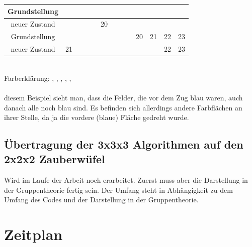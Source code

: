 \documentclass[12pt,a4paper, usenames, dvipsnames]{scrartcl}
\begin{document}
\begin{tabular}{|c|c|c|c|c|c|c|c|c|c|c|c|c|}
\hline
Grundstellung & \color{gray}{0} & \color{gray}{1} & \color{gray}{2} & \color{gray}{3} & \color{red}{4} & \color{red}{5} & \color{ForestGreen}{6} & \color{ForestGreen}{7} & \color{orange}{8} & \color{orange}{9} & \color{blue}{10} & \color{blue}{11} \\
\hline
neuer Zustand & \color{gray}{0} & \color{gray}{1} & \color{red}{4} & \color{red}{12} & 20 & \color{red}{5} & \color{ForestGreen}{6} & \color{ForestGreen}{7} & \color{orange}{8} & \color{gray}{3} & \color{blue}{11} & \color{blue}{19} \\
\hline
\hline
Grundstellung & \color{red}{12} & \color{red}{13} & \color{ForestGreen}{14} & \color{ForestGreen}{15} & \color{orange}{16} & \color{orange}{17} & \color{blue}{18} & \color{blue}{19} & 20 & 21 & 22 & 23 \\
\hline
neuer Zustand & 21 & \color{red}{13} & \color{ForestGreen}{14} & \color{ForestGreen}{15} & \color{orange}{16} & \color{gray}{2} & \color{blue}{10} & \color{blue}{19} & \color{orange}{9} & \color{orange}{17} & 22 & 23\\
\hline
\end{tabular} \\
Farberklärung: \color{gray}{weiß}, \color{blue}{blau}, \color{ForestGreen}{grün}, \color{orange}{orange}, \color{black}{gelb}, \color{red}{rot}\\
\\
\color{black}{An} diesem Beispiel sieht man, dass die Felder, die vor dem Zug blau waren, auch danach alle noch blau sind. Es befinden sich allerdings andere Farbflächen an ihrer Stelle, da ja die vordere (blaue) Fläche gedreht wurde.

\newpage

\subsection*{Übertragung der 3x3x3 Algorithmen auf den 2x2x2 Zauberwüfel}

Wird im Laufe der Arbeit noch erarbeitet. Zuerst muss aber die Darstellung in der Gruppentheorie fertig sein. Der Umfang steht in Abhängigkeit zu dem Umfang des Codes und der Darstellung in der Gruppentheorie.

\newpage


\section{Zeitplan}
\end{document}
